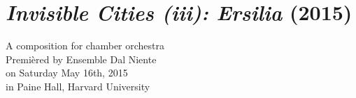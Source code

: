 \chapter{\emph{Invisible Cities (iii): Ersilia} (2015)}
\label{chap:ersilia}

\begin{singlespacing}
\begin{flushright}
A composition for chamber orchestra \\
\vspace*{\baselineskip}
Premi\`{e}red by Ensemble Dal Niente \\
on Saturday May 16th, 2015 \\
in Paine Hall, Harvard University
\end{flushright}
\end{singlespacing}

